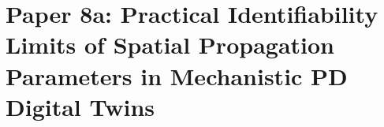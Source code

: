 
\chapter{Paper 8a: Practical Identifiability Limits of Spatial Propagation Parameters in Mechanistic PD Digital Twins}
\label{ch:paper8a}


